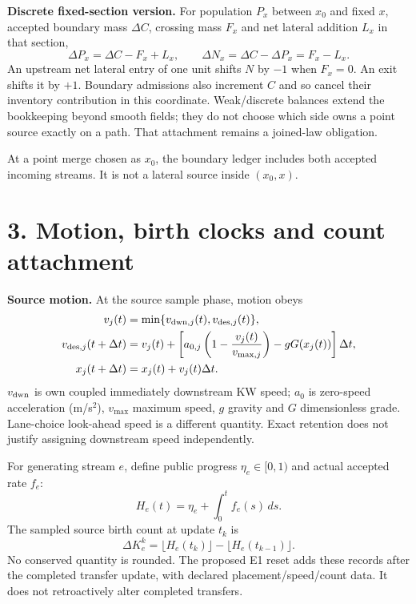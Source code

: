 \documentclass[11pt,a4paper]{article}
\begin{document}
\textbf{Discrete fixed-section version.} For population $P_x$ between $x_0$
and fixed $x$, accepted boundary mass $\Delta C$, crossing mass $F_x$ and net
lateral addition $L_x$ in that section,
\begin{equation}
\Delta P_x=\Delta C-F_x+L_x,\qquad
\Delta N_x=\Delta C-\Delta P_x=F_x-L_x.
\end{equation}
An upstream net lateral entry of one unit shifts $N$ by $-1$ when $F_x=0$.
An exit shifts it by $+1$. Boundary admissions also increment $C$ and so cancel
their inventory contribution in this coordinate. Weak/discrete balances extend
the bookkeeping beyond smooth fields; they do not choose which side owns a
point source exactly on a path. That attachment remains a joined-law obligation.

At a point merge chosen as $x_0$, the boundary ledger includes both accepted
incoming streams. It is not a lateral source inside $(x_0,x)$.

\newpage
\section*{3. Motion, birth clocks and count attachment}
\textbf{Source motion.} At the source sample phase, motion obeys
\begin{align}
v_j(t)&=\min\{v_{{\rm dwn},j}(t),v_{{\rm des},j}(t)\},\\
v_{{\rm des},j}(t+\Delta t)&=v_j(t)+
\left[a_{0,j}\left(1-\frac{v_j(t)}{v_{\max,j}}\right)-gG(x_j(t))\right]\Delta t,
\\
x_j(t+\Delta t)&=x_j(t)+v_j(t)\Delta t.
\end{align}
$v_{\rm dwn}$ is own coupled immediately downstream KW speed; $a_0$ is
zero-speed acceleration (m/s$^2$), $v_{\max}$ maximum speed, $g$ gravity and
$G$ dimensionless grade. Lane-choice look-ahead speed is a different quantity.
Exact retention does not justify assigning downstream speed independently.

For generating stream $e$, define public progress $\eta_e\in[0,1)$ and actual
accepted rate $f_e$:
\begin{equation}
H_e(t)=\eta_e+\int_0^t f_e(s)\,ds.
\end{equation}
The sampled source birth count at update $t_k$ is
\begin{equation}
\Delta K_e^k=\lfloor H_e(t_k)\rfloor-\lfloor H_e(t_{k-1})\rfloor.
\end{equation}
No conserved quantity is rounded. The proposed E1 reset adds these records
after the completed transfer update, with declared placement/speed/count data.
It does not retroactively alter completed transfers.
\end{document}

